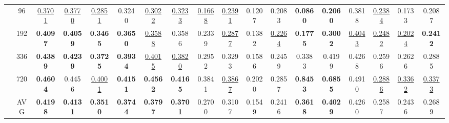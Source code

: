 \begin{table}[!t]
{{\begin{tabular}{l|c|cc|cc|cc|cc|cc|cc|cc|cc}
& 96  & \underline{0.3701} & \underline{0.3770} & \underline{0.2851} & 0.3240 & \underline{0.3022} & \underline{0.3233} & \underline{0.1668} & \underline{0.2391} & 0.1207 & 0.2083 & \textbf{0.0860} & \textbf{0.2060} & 0.3818 & \underline{0.2384} & 0.1733 & 0.2087 \\
& 192 & \textbf{0.4097} & \textbf{0.4059} & \textbf{0.3465} & \textbf{0.3650} & \underline{0.3588} & 0.3586 & 0.2339 & \underline{0.2877} & 0.1382 & \underline{0.2264} & \textbf{0.1775} & \textbf{0.3002} & \underline{0.4043} & \underline{0.2482} & \underline{0.2024} & \textbf{0.2412} \\
& 336 & \textbf{0.4389} & \textbf{0.4239} & \textbf{0.3725} & \textbf{0.3934} & \underline{0.4015} & \underline{0.3820} & 0.2952 & 0.3293 & 0.1586 & 0.2459 & 0.3383 & 0.4199 & 0.4268 & 0.2596 & 0.2626 & 0.2885 \\
& 720 & \textbf{0.4604} & 0.4456 & \underline{0.4001} & \textbf{0.4151} & \textbf{0.4562} & \textbf{0.4165} & 0.3841 & \underline{0.3867} & 0.2020 & 0.2857 & \textbf{0.8453} & \textbf{0.6855} & 0.4910 & \underline{0.2886} & \underline{0.3362} & \underline{0.3373} \\
& AVG & \textbf{0.4198} & \textbf{0.4131} & \textbf{0.3510} & \textbf{0.3744} & \textbf{0.3797} & \textbf{0.3701} & 0.2700 & 0.3107 & 0.1549 & 0.2416 & \textbf{0.3618} & \textbf{0.4029} & 0.4260 & 0.2587 & 0.2436 & 0.2689 \\
\bottomrule
\end{tabular}
}}%


\end{table}
